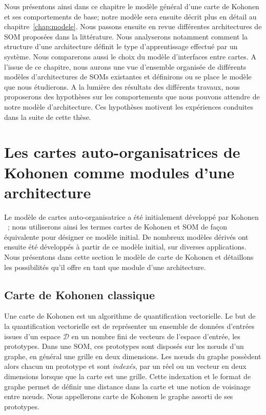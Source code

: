 \documentclass[../main]{subfiles}
\begin{document}
Nous présentons ainsi dans ce chapitre le modèle général d'une carte de Kohonen et ses comportements de base; notre modèle sera ensuite décrit plus en détail au chapitre~\ref{chap:modele}.
Nous passons ensuite en revue différentes architectures de SOM proposées dans la littérature. 
Nous analyserons notamment comment la structure d'une architecture définit le type d'apprentissage effectué par un système. Nous comparerons aussi le choix du modèle d'interfaces entre cartes.
A l'issue de ce chapitre, nous aurons une vue d'ensemble organisée de différents modèles d'architectures de SOMs existantes et définirons ou se place le modèle que nous étudierons.
A la lumière des résultats des différents travaux, nous proposerons des hypothèses sur les comportements que nous pouvons attendre de notre modèle d'architecture. 
Ces hypothèses motivent les expériences conduites dans la suite de cette thèse. 

\section{Les cartes auto-organisatrices de Kohonen comme modules d'une architecture}\label{sec:som001}

Le modèle de cartes auto-organisatrice a été initialement développé par Kohonen \cite{Kohonen1982}~; nous utiliserons ainsi les termes cartes de Kohonen et SOM de façon équivalente pour désigner ce modèle initial.
De nombreux modèles dérivés ont ensuite été développés à partir de ce modèle initial, sur diverses applications.
Nous présentons dans cette section le modèle de carte de Kohonen et détaillons les possibilités qu'il offre en tant que module d'une architecture. 

\subsection{Carte de Kohonen classique}

Une carte de Kohonen est un algorithme de quantification vectorielle. Le but de la quantification vectorielle est de représenter un ensemble de données d'entrées issues d'un espace $\mathcal{D}$ en un nombre fini de vecteurs de l'espace d'entrée, les prototypes. Dans une SOM, ces prototypes sont disposés sur les n\oe{}uds d'un graphe, en général une grille en deux dimensions.
Les n\oe{}uds du graphe possèdent alors chacun un prototype et sont \emph{indexés}, par un réel ou un vecteur en deux dimensions lorsque que la carte est une grille.
Cette indexation et le format de graphe permet de définir une distance dans la carte et une notion de voisinage entre n\oe{}uds.
Nous appellerons carte de Kohonen le graphe assorti de ses prototypes.
\end{document}

